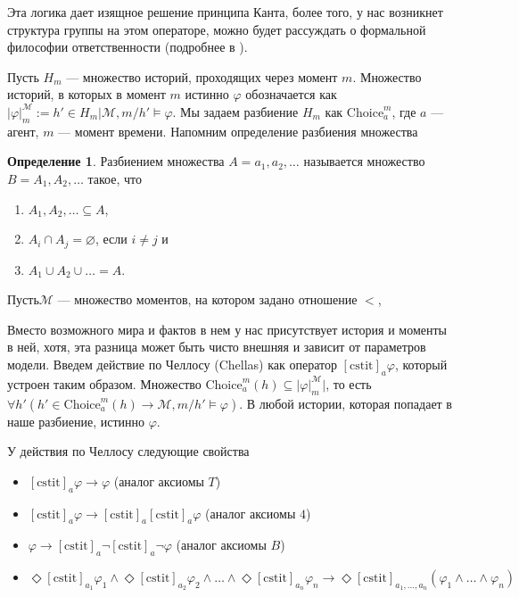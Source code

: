 \documentclass[openany]{book}
\theoremstyle{plain}
\theoremstyle{definition}
\newtheorem{defn}{Определение}[section]
\begin{document}
Эта логика дает изящное решение принципа Канта, более того, у нас возникнет структура группы на этом операторе, можно будет рассуждать о формальной философии ответственности (подробнее в \cite{Duijf}).

Пусть \(H_m\) --- множество историй, проходящих через момент \(m\). Множество историй, в которых в момент \(m\) истинно \(\varphi\) обозначается как \(|\varphi|_m^{\mathcal{M}} := {h' \in H_m | \mathcal{M}, m/h' \models \varphi}\). Мы задаем разбиение \(H_m\) как \(\mathrm{Choice}_a^m\), где \(a\) --- агент, \(m\) --- момент времени. Напомним определение разбиения множества 
\begin{defn}
Разбиением множества \(A = {a_1, a_2, \dots}\) называется множество \(B = {A_1, A_2, \dots}\) такое, что
\begin{enumerate}
\item \(A_1, A_2, \dots \subseteq A\),
\item \(A_i \cap A_j = \varnothing\), если \(i \not= j\) и
\item \(A_1 \cup A_2 \cup \dots = A\).
\end{enumerate}
\end{defn}

Пусть\(\mathcal{M}\) --- множество моментов, на котором задано отношение \(<\), 

Вместо возможного мира и фактов в нем у нас присутствует история и моменты в ней, хотя, эта разница может быть чисто внешняя и зависит от параметров модели. Введем действие по Челлосу (Chellas) как оператор \([\mathrm{cstit}]_a \varphi\), который устроен таким образом. Множество \(\mathrm{Choice}_a^m (h) \subseteq |\varphi|_m^{\mathcal{M}}|\), то есть \(\forall h' (h' \in \mathrm{Choice}_a^m (h) \to \mathcal{M}, m/h' \models \varphi)\). В любой истории, которая попадает в наше разбиение, истинно \(\varphi\). 

У действия по Челлосу следующие свойства
\begin{itemize}
\item \([\mathrm{cstit}]_a \varphi \to \varphi\) (аналог аксиомы \(T\))
\item \([\mathrm{cstit}]_a \varphi \to [\mathrm{cstit}]_a [\mathrm{cstit}]_a \varphi\) (аналог аксиомы \(4\))
\item \(\varphi \to  [\mathrm{cstit}]_a \neg [\mathrm{cstit}]_a \neg \varphi\) (аналог аксиомы \(B\))
\item \(\Diamond [\mathrm{cstit}]_{a_1} \varphi_1 \land \Diamond[\mathrm{cstit}]_{a_2} \varphi_2 \land \dots \land \Diamond[\mathrm{cstit}]_{a_n} \varphi_n \to \Diamond [\mathrm{cstit}]_{a_1, \ldots, a_n} (\varphi_1 \land \dots \land \varphi_n) \)
\end{itemize}
\end{document}
